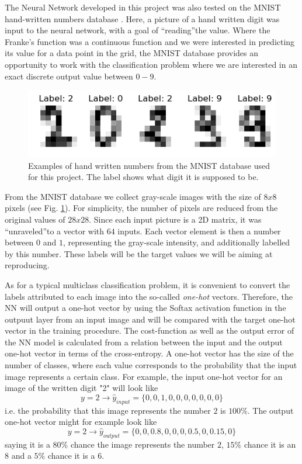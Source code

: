 \documentclass{emulateapj}
\begin{document}
The Neural Network developed in this project was also tested on the MNIST hand-written numbers database \cite{MNIST}. Here, a picture of a hand written digit was input to the neural network, with a goal of \textquotedblleft reading\textquotedblright the value. Where the Franke's function was a continuous function and we were interested in predicting its value for a data point in the grid, the MNIST database provides an opportunity to work with the classification problem where we are interested in an exact discrete output value between $0-9$.
\begin{figure}[h]
    \centering
    \includegraphics[width=.49\textwidth]{Figures/MNIST_illustrated.png}
    \caption{Examples of hand written numbers from the MNIST database used for this project. The label shows what digit it is supposed to be.}
    \label{fig:MNIST_illustrations}
\end{figure}

From the MNIST database we collect gray-scale images with the size of $8x8$ pixels (see Fig. \ref{fig:MNIST_illustrations}). For simplicity, the number of pixels are reduced from the original values of $28x28$. Since each input picture is a 2D matrix, it was \textquotedblleft unraveled\textquotedblright to a vector with $64$ inputs. Each vector element is then a number between $0$ and $1$, representing the gray-scale intensity, and additionally labelled by this number. These labels will be the target values we will be aiming at reproducing.

As for a typical multiclass classification problem, it is convenient to convert the labels attributed to each image into the so-called \textit{one-hot} vectors. 
Therefore, the NN will output a one-hot vector by using the Softax activation function in the outpuut layer from an input image and will be compared with the target one-hot vector in the training procedure. The cost-function as well as the output error of the NN model is calculated from a relation between the input and the output one-hot vector in terms of the cross-entropy. A one-hot vector has the size of the number of classes, where each value corresponds to the probability that the input image represents a certain class. For example, the input one-hot vector for an image of the written digit "2" will  look like 
\begin{equation}
y=2 \rightarrow \hat{y}_{input} = \{0,0,1,0,0,0,0,0,0,0\}
\end{equation}
i.e. the probability that this image represents the number $2$ is $100\%$. The output one-hot vector might for example look like 
\begin{equation}
y=2 \rightarrow \hat{y}_{output} = \{0,0,0.8,0,0,0,0.5,0,0.15,0\}    
\end{equation}
saying it is a $80\%$ chance the image represents the number $2$, $15\%$ chance it is an $8$ and a $5\%$ chance it is a $6$.
\end{document}
